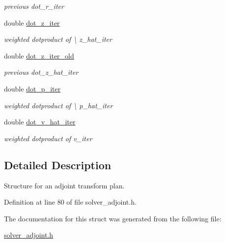 \begin{DoxyCompactItemize}
\begin{DoxyCompactList}\small\item\em previous dot\-\_\-r\-\_\-iter \end{DoxyCompactList}\item 
\hypertarget{structinfft__adjoint__plan_a6cca862303d84903e408f5a2ea02aa9c}{double \hyperlink{structinfft__adjoint__plan_a6cca862303d84903e408f5a2ea02aa9c}{dot\-\_\-z\-\_\-iter}}\label{structinfft__adjoint__plan_a6cca862303d84903e408f5a2ea02aa9c}

\begin{DoxyCompactList}\small\item\em weighted dotproduct of \textbackslash{} z\-\_\-hat\-\_\-iter \end{DoxyCompactList}\item 
\hypertarget{structinfft__adjoint__plan_aa78f22f1c5c917f665b2f1af3e7df191}{double \hyperlink{structinfft__adjoint__plan_aa78f22f1c5c917f665b2f1af3e7df191}{dot\-\_\-z\-\_\-iter\-\_\-old}}\label{structinfft__adjoint__plan_aa78f22f1c5c917f665b2f1af3e7df191}

\begin{DoxyCompactList}\small\item\em previous dot\-\_\-z\-\_\-hat\-\_\-iter \end{DoxyCompactList}\item 
\hypertarget{structinfft__adjoint__plan_a2ddddb18e229f9d2d4b9eb11c36d0529}{double \hyperlink{structinfft__adjoint__plan_a2ddddb18e229f9d2d4b9eb11c36d0529}{dot\-\_\-p\-\_\-iter}}\label{structinfft__adjoint__plan_a2ddddb18e229f9d2d4b9eb11c36d0529}

\begin{DoxyCompactList}\small\item\em weighted dotproduct of \textbackslash{} p\-\_\-hat\-\_\-iter \end{DoxyCompactList}\item 
\hypertarget{structinfft__adjoint__plan_a1a005f3e97b207a1d42cbc8e2ad3a5e1}{double \hyperlink{structinfft__adjoint__plan_a1a005f3e97b207a1d42cbc8e2ad3a5e1}{dot\-\_\-v\-\_\-hat\-\_\-iter}}\label{structinfft__adjoint__plan_a1a005f3e97b207a1d42cbc8e2ad3a5e1}

\begin{DoxyCompactList}\small\item\em weighted dotproduct of v\-\_\-iter \end{DoxyCompactList}\end{DoxyCompactItemize}


\subsection{Detailed Description}
Structure for an adjoint transform plan. 

Definition at line 80 of file solver\-\_\-adjoint.\-h.



The documentation for this struct was generated from the following file\-:\begin{DoxyCompactItemize}
\item 
\hyperlink{solver__adjoint_8h}{solver\-\_\-adjoint.\-h}\end{DoxyCompactItemize}

